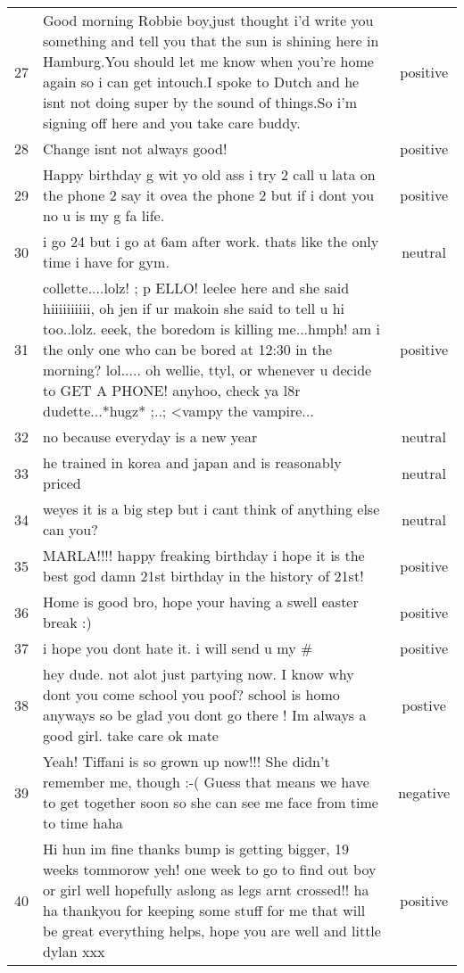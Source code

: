 \begin{center}
\begin{footnotesize}
\begin{longtable}{cp{3.8in}c}
27 & Good morning Robbie boy,just thought i'd write you something and tell you that the sun is shining here in Hamburg.You should let me know when you're home again so i can get intouch.I spoke to Dutch and he isnt not doing super by the sound of things.So i'm signing off here and you take care buddy. & positive\\
28 & Change isnt not always good! & positive\\
29 & Happy birthday g wit yo old ass i try 2 call u lata on the phone 2 say it ovea the phone 2 but if i dont you no u is my g fa life. & positive\\
30 & i go 24 but i go at 6am after work. thats like the only time i have for gym. & neutral\\
31 & collette....lolz! ; p ELLO! leelee here and she said hiiiiiiiiii, oh jen if ur makoin she said to tell u hi too..lolz. eeek, the boredom is killing me...hmph! am i the only one who can be bored at 12:30 in the morning? lol..... oh wellie, ttyl, or whenever u decide to GET A PHONE! anyhoo, check ya l8r dudette...*hugz* ;..; <vampy the vampire... & positive\\
32 & no because everyday is a new year & neutral\\
33 & he trained in korea and japan and is reasonably priced & neutral\\
34 & weyes it is a big step but i cant think of anything else can you? & neutral\\
35 & MARLA!!!! happy freaking birthday i hope it is the best god damn 21st birthday in the history of 21st! & positive\\
36 & Home is good bro, hope your having a swell easter break :) & positive\\
37 & i hope you dont hate it. i will send u my \# & positive\\
38 & hey dude. not alot just partying now. I know why dont you come school you poof? school is homo anyways so be glad you dont go there ! Im always a good girl. take care ok mate & postive\\
39 & Yeah!  Tiffani is so grown up now!!!  She didn't remember me, though :-(  Guess that means we have to get together soon so she can see me face from time to time haha & negative\\
40 & Hi hun im fine thanks bump is getting bigger, 19 weeks tommorow yeh! one week to go to find out boy or girl well hopefully aslong as legs arnt crossed!! ha ha thankyou for keeping some stuff for me that will be great everything helps, hope you are well and little dylan xxx & positive\\

\end{longtable}
\end{footnotesize}
\end{center}
